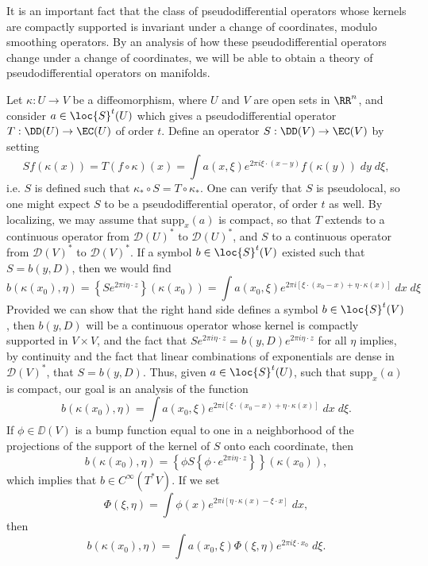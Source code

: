 It is an important fact that the class of pseudodifferential operators whose kernels are compactly supported is invariant under a change of coordinates, modulo smoothing operators. By an analysis of how these pseudodifferential operators change under a change of coordinates, we will be able to obtain a theory of pseudodifferential operators on manifolds.

Let $\kappa: U \to V$ be a diffeomorphism, where $U$ and $V$ are open sets in $\RR^n$, and consider $a \in \loc{S}^t(U)$ which gives a pseudodifferential operator $T: \DD(U) \to \EC(U)$ of order $t$. Define an operator $S: \DD(V) \to \EC(V)$ by setting
%
\[ Sf(\kappa(x)) = T(f \circ \kappa)(x) = \int a(x,\xi) e^{2 \pi i \xi \cdot (x - y)} f(\kappa(y))\; dy\; d\xi, \]
%
i.e. $S$ is defined such that $\kappa_* \circ S = T \circ \kappa_*$. One can verify that $S$ is pseudolocal, so one might expect $S$ to be a pseudodifferential operator, of order $t$ as well. By localizing, we may assume that $\text{supp}_x(a)$ is compact, so that $T$ extends to a continuous operator from $\mathcal{D}(U)^*$ to $\mathcal{D}(U)^*$, and $S$ to a continuous operator from $\mathcal{D}(V)^*$ to $\mathcal{D}(V)^*$. If a symbol $b \in \loc{S}^t(V)$ existed such that $S = b(y,D)$, then we would find
%
\[ b(\kappa(x_0),\eta) = \left\{ S e^{2 \pi i \eta \cdot z} \right\}(\kappa(x_0)) = \int a(x_0,\xi) e^{2 \pi i [\xi \cdot (x_0 - x) + \eta \cdot \kappa(x)]}\; dx\; d\xi \]
%
Provided we can show that the right hand side defines a symbol $b \in \loc{S}^t(V)$, then $b(y,D)$ will be a continuous operator whose kernel is compactly supported in $V \times V$, and the fact that $S e^{2 \pi i \eta \cdot z} = b(y,D) e^{2 \pi i \eta \cdot z}$ for all $\eta$ implies, by continuity and the fact that linear combinations of exponentials are dense in $\mathcal{D}(V)^*$, that $S = b(y,D)$. Thus, given $a \in \loc{S}^t(U)$, such that $\text{supp}_x(a)$ is compact, our goal is an analysis of the function
%
\[ b(\kappa(x_0),\eta) = \int a(x_0,\xi) e^{2 \pi i [ \xi \cdot (x_0 - x) + \eta \cdot \kappa(x) ]}\; dx\; d\xi. \]
%
If $\phi \in \DD(V)$ is a bump function equal to one in a neighborhood of the projections of the support of the kernel of $S$ onto each coordinate, then
%
\[ b(\kappa(x_0),\eta) = \left\{ \phi S \left\{ \phi \cdot e^{2 \pi i \eta \cdot z} \right\} \right\}(\kappa(x_0)), \]
%
which implies that $b \in C^\infty(T^* V)$. If we set
%
\[ \Phi(\xi,\eta) = \int \phi(x) e^{2 \pi i [ \eta \cdot \kappa(x) - \xi \cdot x ]}\; dx, \]
%
then
%
\[ b(\kappa(x_0), \eta) = \int a(x_0,\xi) \Phi(\xi,\eta) e^{2 \pi i \xi \cdot x_0}\; d\xi. \]
